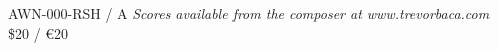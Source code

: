 \documentclass[11pt]{report}
\begin{document}
\null \vfill

AWN-000-RSH / A \hfill
\textit{Scores available from the composer at www.trevorbaca.com}
\hfill \$20 / \euro 20
\end{document}
